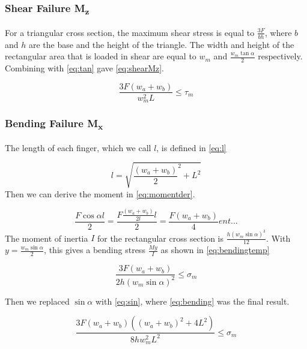 \subsubsection{Shear Failure M\textsubscript{z}}
For a triangular cross section, the maximum shear stress is equal to $\frac{3F}{bh}$, where $b$ and $h$ are the base and the height of the triangle. The width and height of the rectangular area that is loaded in shear are equal to $w_m$ and $\frac{w_m \tan \alpha}{2} $ respectively. Combining with \ref{eq:tan} gave \autoref{eq:shearMz}.

\begin{equation}
	\label{eq:shearMz}
	\frac{ 3 F \left(w_a + w_b \right) }{ w_m ^2 L} \le \tau_m	
\end{equation}


\subsubsection{Bending Failure M\textsubscript{x}}
The length of each finger, which we call $l$, is defined in \autoref{eq:l}

\begin{equation}
	\label{eq:l}
	l = \sqrt{ \frac{\left( w_a + w_b \right)}{2} ^2 + L^2 }
\end{equation}
Then we can derive the moment in \autoref{eq:momentder}.

\begin{equation}
	\label{eq:momentder}
	\frac{F \cos \alpha l}{2} =  \frac{F \frac{\left(w_a + w_b \right)}{2l} l}{2} = \frac{F \left(w_a + w_b\right)}{4}ent...
\end{equation}
The moment of inertia $I$ for the rectangular cross section is $\frac{h \left(w_m \sin \alpha \right)^3}{12}$. With $y = \frac{w_m \sin \alpha }{2}$, this gives a bending stress $\frac{M y}{I}$ as shown in \autoref{eq:bendingtemp}

\begin{equation}
	\label{eq:bendingtemp}
	\frac{3 F\left(w_a + w_b \right)}{2 h \left( w_m \sin \alpha \right)^2 } \le \sigma_m
\end{equation}

Then we replaced $\sin \alpha$ with \ref{eq:sin}, where \autoref{eq:bending} was the final result.

\begin{equation}
	\label{eq:bending}
	\frac{ 3 F \left(w_a + w_b \right) \left(\left(w_a + w_b \right) ^2 + 4L^2 \right)  }{ 8h w_m^2 L^2 }  \le \sigma_m
\end{equation}

